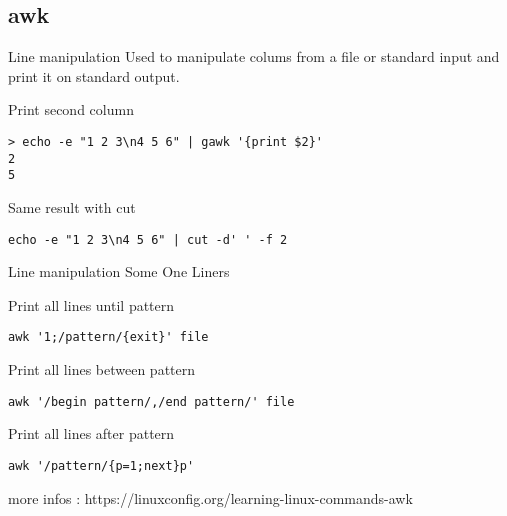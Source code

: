 \subsection{awk}

\begin{frame}[fragile]{Line manipulation}
Used to manipulate colums from a file or standard input and print it on standard output.
  \pause
  \begin{exampleblock}{Print second column}
    \begin{lstlisting}[showstringspaces=false]
> echo -e "1 2 3\n4 5 6" | gawk '{print $2}'
2
5
    \end{lstlisting}
  \end{exampleblock}
  \pause
  \begin{exampleblock}{Same result with cut}
    \begin{lstlisting}[showstringspaces=false]
 echo -e "1 2 3\n4 5 6" | cut -d' ' -f 2
    \end{lstlisting}
  \end{exampleblock}
\pause

\end{frame}

\begin{frame}[fragile]{Line manipulation}
Some One Liners
  \pause
  \begin{exampleblock}{Print all lines until pattern}
    \begin{lstlisting}[showstringspaces=false]
awk '1;/pattern/{exit}' file
    \end{lstlisting}
  \end{exampleblock}
  \pause

  \begin{exampleblock}{Print all lines between pattern}
    \begin{lstlisting}[showstringspaces=false]
awk '/begin pattern/,/end pattern/' file
    \end{lstlisting}
  \end{exampleblock}
  \pause

  \begin{exampleblock}{Print all lines after pattern}
    \begin{lstlisting}[showstringspaces=false]
awk '/pattern/{p=1;next}p'
    \end{lstlisting}
  \end{exampleblock}
\pause

more infos : https://linuxconfig.org/learning-linux-commands-awk
\end{frame}

